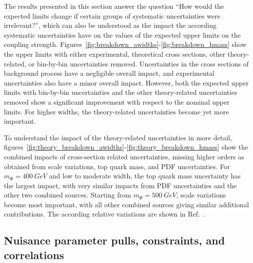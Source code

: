 The results presented in this section answer the question ``How would the expected limits change if certain groups of systematic uncertainties were irrelevant?'', which can also be understood as the impact the according systematic uncertainties have on the values of the expected upper limits on the coupling strength.
Figures~\ref{fig:breakdown_awidths}-\ref{fig:breakdown_hmass} show the upper limits with either experimental, theoretical cross sections, other theory-related, or bin-by-bin uncertainties removed.
Uncertainties in the cross sections of background process have a negligible overall impact, and experimental uncertainties also have a minor overall impact.
However, both the expected upper limits with bin-by-bin uncertainties and the other theory-related uncertainties removed show a significant improvement with respect to the nominal upper limits.
For higher widths, the theory-related uncertainties become yet more important.

To understand the impact of the theory-related uncertainties in more detail, figures~\ref{fig:theory_breakdown_awidths}-\ref{fig:theory_breakdown_hmass} show the combined impacts of cross-section related uncertainties, missing higher orders as obtained from scale variations, top quark mass, and PDF uncertainties.
For $m_\Phi = 400~GeV$ and low to moderate width, the top quark mass uncertainty has the largest impact, with very similar impacts from PDF uncertainties and the other two combined sources.
Starting from $m_\Phi = 500~GeV$, scale variations become most important, with all other combined sources giving similar additional contributions.
The according relative variations are shown in Ref.~\cite{CMS-AN-16-272}.

\subsection{Nuisance parameter pulls, constraints, and correlations}

